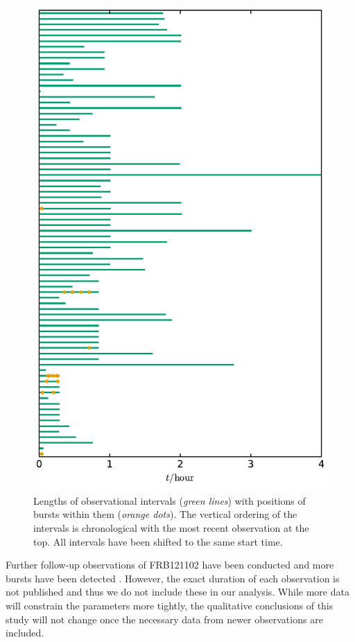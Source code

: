 \documentclass[fleqn,usenatbib]{mnras}
\newcommand{\new}[1]{#1}
\begin{document}
\begin{figure}
	\includegraphics[width=\columnwidth]{intervals.pdf}
	\caption{\label{fig:intervals}Lengths of observational intervals (\emph{green lines}) with positions of bursts within them (\emph{orange dots}). \new{The vertical ordering of the intervals is chronological with the most recent observation at the top.} All intervals have been shifted to the same start time.}
\end{figure}

\new{Further follow-up observations of FRB121102 have been conducted and more bursts have been detected \citep[e.g.,][]{chatterjee-2017}. However, the exact duration of each observation is not published and thus we do not include these in our analysis. While more data will constrain the parameters more tightly, the qualitative conclusions of this study will not change once the necessary data from newer observations are included.}
\end{document}
